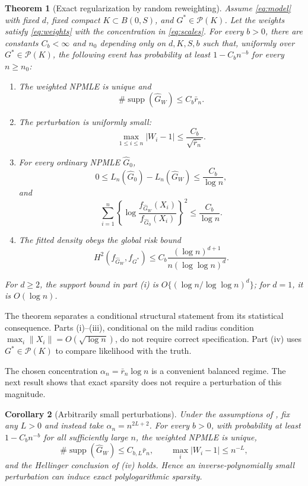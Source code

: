 \documentclass[11pt]{article}
\newtheorem{theorem}{Theorem}[section]
\newtheorem{corollary}[theorem]{Corollary}
\theoremstyle{definition}
\theoremstyle{remark}
\DeclareMathOperator{\supp}{supp}
\newcommand{\Pcal}{\mathcal P}
\newcommand{\norm}[1]{\lVert #1\rVert}
\newcommand{\abs}[1]{\lvert #1\rvert}
\newcommand{\Ghat}{\widehat G}
\begin{document}
\begin{theorem}[Exact regularization by random reweighting]
\label{thm:main}
Assume \eqref{eq:model} with fixed $d$, fixed compact
$K\subset B(0,S)$, and $G^*\in\Pcal(K)$.  Let the weights satisfy
\eqref{eq:weights} with the concentration in \eqref{eq:scales}.  For every
$b>0$, there are constants $C_b<\infty$ and $n_0$ depending only on
$d,K,S,b$ such that, uniformly over $G^*\in\Pcal(K)$, the following event has
probability at least $1-C_bn^{-b}$ for every $n\ge n_0$:
\begin{enumerate}[label=\textup{(\roman*)}]
\item The weighted NPMLE is unique and
\[
  \#\supp(\Ghat_W)\le C_b\bar r_n.
\]
\item The perturbation is uniformly small:
\[
  \max_{1\le i\le n}\abs{W_i-1}\le \frac{C_b}{\sqrt{\bar r_n}}.
\]
\item For every ordinary NPMLE $\Ghat_0$,
\[
  0\le L_n(\Ghat_0)-L_n(\Ghat_W)\le\frac{C_b}{\log n},
\]
and
\[
 \sum_{i=1}^n
 \left\{\log\frac{f_{\Ghat_W}(X_i)}{f_{\Ghat_0}(X_i)}\right\}^2
 \le\frac{C_b}{\log n}.
\]
\item The fitted density obeys the global risk bound
\[
 H^2(f_{\Ghat_W},f_{G^*})
 \le C_b\frac{(\log n)^{d+1}}
 {n(\log\log n)^d}.
\]
\end{enumerate}
For $d\ge2$, the support bound in part \textup{(i)} is
$O\{(\log n/\log\log n)^d\}$; for $d=1$, it is $O(\log n)$.
\end{theorem}

The theorem separates a conditional structural statement from its statistical
consequence.  Parts (i)--(iii), conditional on the mild radius condition
$\max_i\norm{X_i}=O(\sqrt{\log n})$, do not require correct specification.
Part (iv) uses $G^*\in\Pcal(K)$ to compare likelihood with the truth.

The chosen concentration $\alpha_n=\bar r_n\log n$ is a convenient balanced
regime.  The next result shows that exact sparsity does not require a
perturbation of this magnitude.

\begin{corollary}[Arbitrarily small perturbations]
\label{cor:tiny}
Under the assumptions of , fix any $L>0$ and instead take
$\alpha_n=n^{2L+2}$.  For every $b>0$, with probability at least
$1-C_bn^{-b}$ for all sufficiently large $n$, the weighted NPMLE is unique,
\[
 \#\supp(\Ghat_W)\le C_{b,L}\bar r_n,
 \qquad
 \max_i\abs{W_i-1}\le n^{-L},
\]
and the Hellinger conclusion of (iv) holds.  Hence an
inverse-polynomially small perturbation can induce exact polylogarithmic
sparsity.
\end{corollary}
\end{document}
